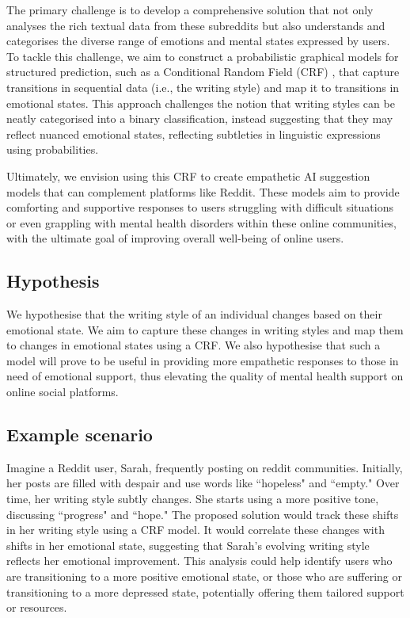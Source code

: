 \documentclass[conference,compsoc]{IEEEtran}
\begin{document}
The primary challenge is to develop a comprehensive solution that not only analyses the rich textual data from these subreddits but also understands and categorises the diverse range of emotions and mental states expressed by users. To tackle this challenge, we aim to construct a probabilistic graphical models for structured prediction, such as a Conditional Random Field (CRF) \citep{Lafferty+01:CRF}, that capture transitions in sequential data (i.e., the writing style) and map it to transitions in emotional states. This approach challenges the notion that writing styles can be neatly categorised into a binary classification, instead suggesting that they may reflect nuanced emotional states, reflecting subtleties in linguistic expressions using probabilities. 

Ultimately, we envision using this CRF to create empathetic AI suggestion models that can complement platforms like Reddit. These models aim to provide comforting and supportive responses to users struggling with difficult situations or even grappling with mental health disorders within these online communities, with the ultimate goal of improving overall well-being of online users. 

\subsection{Hypothesis}
We hypothesise that the writing style of an individual changes based on their emotional state. We aim to capture these changes in writing styles and map them to changes in emotional states using a CRF. We also hypothesise that such a model will prove to be useful in providing more empathetic responses to those in need of emotional support, thus elevating the quality of mental health support on online social platforms.

\subsection{Example scenario}
Imagine a Reddit user, Sarah, frequently posting on reddit communities. Initially, her posts are filled with despair and use words like ``hopeless" and ``empty." Over time, her writing style subtly changes. She starts using a more positive tone, discussing ``progress" and ``hope." The proposed solution would track these shifts in her writing style using a CRF model. It would correlate these changes with shifts in her emotional state, suggesting that Sarah's evolving writing style reflects her emotional improvement. This analysis could help identify users who are transitioning to a more positive emotional state, or those who are suffering or transitioning to a more depressed state, potentially offering them tailored support or resources.
\end{document}
